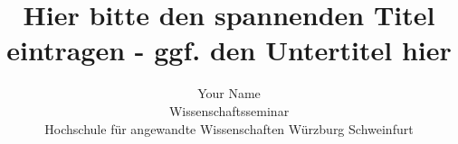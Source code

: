 
       

\title{Hier bitte den spannenden Titel eintragen - ggf. den Untertitel hier}
            
\author{Your Name\\Wissenschaftsseminar\\Hochschule f{\"u}r angewandte Wissenschaften W{\"u}rzburg Schweinfurt}
        